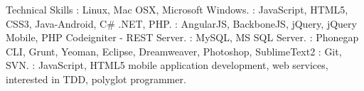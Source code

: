\documentclass{resume}
\author{Rahmathullah M}
\begin{document}
\maketitle



\begin{category}{Technical Skills}
  : Linux, Mac OSX, Microsoft Windows.
  : JavaScript, HTML5, CSS3, Java-Android, C\# .NET, PHP.
  : AngularJS, BackboneJS, jQuery, jQuery Mobile, PHP Codeigniter - REST Server.
  : MySQL, MS SQL Server.
  : Phonegap CLI, Grunt, Yeoman, Eclipse, Dreamweaver, Photoshop, SublimeText2
  : Git, SVN.
  : JavaScript, HTML5 mobile application development, web services, interested in TDD, polyglot programmer.
\end{category} 

\end{document}
